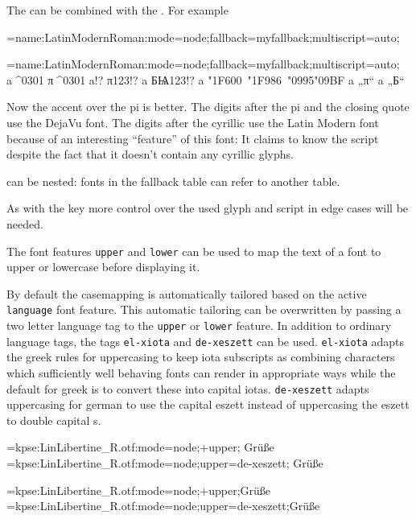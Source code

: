    The  can be combined with the . For example

   \beginlisting
   \font\test={name:LatinModernRoman:mode=node;fallback=myfallback;multiscript=auto;}
   \endlisting

   {\Large
    \font\test={name:LatinModernRoman:mode=node;fallback=myfallback;multiscript=auto;} a^^^^0301 π^^^^0301 a!? π123!? a БѨ123!? a \char"1F600\ \char"1F986\ \char"0995\char"09BF a „π“ a „Б“
   }

   Now the accent over the pi is better. The digits after the pi and the closing quote use the DejaVu font. The digits after
   the cyrillic use the Latin Modern font because of an interesting \enquote{feature} of this font: It claims to know the  script despite the fact that it doesn't contain any cyrillic glyphs.

    can be nested: fonts in the fallback table can refer to another  table.

   As with the  key more control over the used glyph and script in edge cases will be needed.
   \endaltitem

   The\label{upperlower}
   font features \texttt{upper} and \texttt{lower} can be used to map
   the text of a font to upper or lowercase before displaying it.

   By default the casemapping is automatically tailored based on the active
   \texttt{language} font feature. This automatic tailoring can be overwritten
   by passing a two letter language tag to the \texttt{upper} or \texttt{lower}
   feature. In addition to ordinary language tags, the tags \texttt{el-xiota}
   and \texttt{de-xeszett} can be used. \texttt{el-xiota} adapts the greek
   rules for uppercasing to keep iota subscripts as combining characters which
   sufficiently well behaving fonts can render in appropriate ways while the
   default for greek is to convert these into capital iotas. \texttt{de-xeszett}
   adapts uppercasing for german to use the capital eszett instead of
   uppercasing the eszett to double capital s.

   \beginlisting
   \font\test={kpse:LinLibertine_R.otf:mode=node;+upper;}
   \test Grüße
   \font\test={kpse:LinLibertine_R.otf:mode=node;upper=de-xeszett;}
   \test Grüße
   \endlisting

   {\Large
     \font\test={kpse:LinLibertine\string_R.otf:mode=node;+upper;}\test Grüße
     \font\test={kpse:LinLibertine\string_R.otf:mode=node;upper=de-xeszett;}\test Grüße
   }

